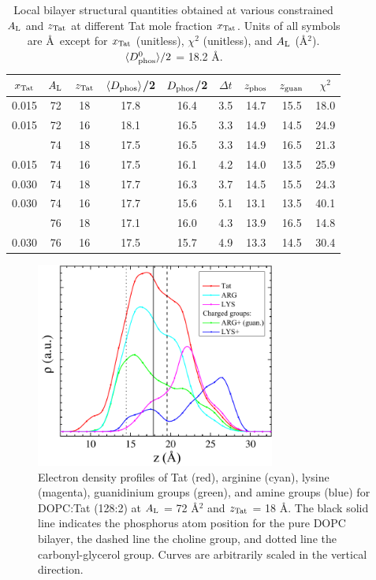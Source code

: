 \begin{table}[htbp]
  \centering
  \begin{tabular}{ccccccccc}
    \hline
    \rule{0pt}{14pt} %
    $x_\textrm{Tat}$ & $A_\textrm{L}$ & $z_\textrm{Tat}$ & $\langle D_\text{phos}\rangle$/2 & $D_\text{phos}$/2 & $\Delta t$ & $z_\textrm{phos}$ & $z_\textrm{guan}$ & $\chi^2$ \\
    \hline   
    0.015 & 72 & 18 & 17.8 & 16.4 & 3.5 & 14.7 & 15.5 & 18.0 \\ 
    0.015 & 72 & 16 & 18.1 & 16.5 & 3.3 & 14.9 & 14.5 & 24.9 \\
    \hdashline
    0.015 & 74 & 18 & 17.5 & 16.5 & 3.3 & 14.9 & 16.5 & 21.3 \\
    0.015 & 74 & 16 & 17.5 & 16.1 & 4.2 & 14.0 & 13.5 & 25.9 \\
    \hline                                                   
    0.030 & 74 & 18 & 17.7 & 16.3 & 3.7 & 14.5 & 15.5 & 24.3 \\ 
    0.030 & 74 & 16 & 17.7 & 15.6 & 5.1 & 13.1 & 13.5 & 40.1 \\
    \hdashline
    0.030 & 76 & 18 & 17.1 & 16.0 & 4.3 & 13.9 & 16.5 & 14.8 \\
    0.030 & 76 & 16 & 17.5 & 15.7 & 4.9 & 13.3 & 14.5 & 30.4 \\
    \hline
  \end{tabular}
  \caption{Local bilayer structural quantities obtained at various
  constrained $A_\textrm{L}$ and $z_\textrm{Tat}$ at different Tat mole fraction $x_\textrm{Tat}$.
  Units of all symbols are \AA\ except for $x_\textrm{Tat}$ (unitless), 
  $\chi^2$ (unitless), and $A_\textrm{L}$ (\AA$^2$). 
  $\langle D_\text{phos}^0\rangle/2$ = 18.2 \AA.
  }
  \label{tab:local_thickness}
\end{table}

\begin{figure}[htbp]
  \centering
  \includegraphics[width=0.7\textwidth]{figures/Tat/MD_Results/arginine-lysine/charged-groups}
  \caption[Electron density profiles of Tat]
  {Electron density profiles of Tat (red), arginine (cyan), lysine (magenta),
  guanidinium groups (green), and amine groups (blue) 
  for DOPC:Tat (128:2) at $A_\textrm{L}$ = 72 \AA$^2$ and $z_\textrm{Tat}$ = 18 \AA. 
  The black solid line indicates the phosphorus atom position for the pure DOPC
  bilayer, the dashed line the choline group, and dotted line the 
  carbonyl-glycerol group.
  Curves are arbitrarily scaled in the vertical direction.}
  \label{fig:charged-groups}
\end{figure}

